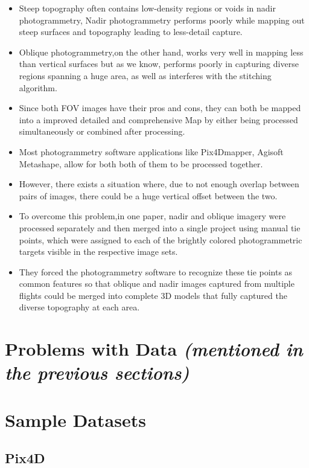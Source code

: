 \documentclass[11pt,twocolumn,letterpaper]{article}
\begin{document}
\begin{itemize}
    \item Steep topography often contains low-density regions or voids in nadir photogrammetry, 
    Nadir photogrammetry performs poorly while mapping out steep surfaces and topography leading to less-detail capture.
    \item Oblique photogrammetry,on the other hand, works very well in mapping less than vertical surfaces but as we know, performs poorly in capturing diverse regions spanning a huge area, as well as interferes with the stitching algorithm.
    \item Since both FOV images have their pros and cons, they can both be mapped into a improved detailed and comprehensive Map by either being processed simultaneously or combined after processing. 
    \item Most photogrammetry software applications like Pix4Dmapper, Agisoft Metashape, allow for both both of them to be processed together.
    \item However, there exists a situation where, due to not enough overlap between pairs of images, there could be a huge vertical offset between the two. 
    \item To overcome this problem,in one paper, nadir and oblique imagery were processed separately and then merged into a single project using manual tie points, which were assigned to each of the brightly
    colored photogrammetric targets visible in the respective image sets.
    \item They forced the photogrammetry software to recognize these tie points as common features so that oblique and nadir images captured from multiple flights could be merged into complete 3D models that fully captured the diverse topography at each area.
    
\end{itemize}

\section{Problems with Data \emph{(mentioned in the previous sections)} }

\section{Sample Datasets}
\subsection{Pix4D}
\end{document}
